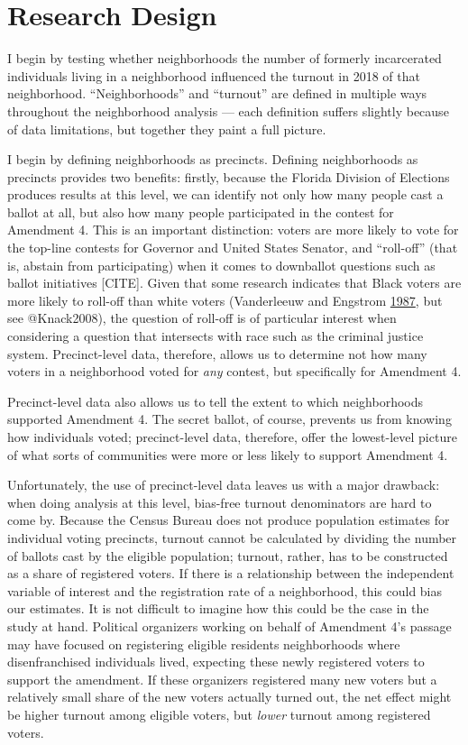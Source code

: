 \documentclass[
  12pt,
]{article}
\begin{document}
\hypertarget{research-design}{%
\section*{Research Design}\label{research-design}}

I begin by testing whether neighborhoods the number of formerly incarcerated individuals living in a neighborhood influenced the turnout in 2018 of that neighborhood. ``Neighborhoods'' and ``turnout'' are defined in multiple ways throughout the neighborhood analysis --- each definition suffers slightly because of data limitations, but together they paint a full picture.

I begin by defining neighborhoods as precincts. Defining neighborhoods as precincts provides two benefits: firstly, because the Florida Division of Elections produces results at this level, we can identify not only how many people cast a ballot at all, but also how many people participated in the contest for Amendment 4. This is an important distinction: voters are more likely to vote for the top-line contests for Governor and United States Senator, and ``roll-off'' (that is, abstain from participating) when it comes to downballot questions such as ballot initiatives {[}CITE{]}. Given that some research indicates that Black voters are more likely to roll-off than white voters (Vanderleeuw and Engstrom \protect\hyperlink{ref-Vanderleeuw1987}{1987}, but see @Knack2008), the question of roll-off is of particular interest when considering a question that intersects with race such as the criminal justice system. Precinct-level data, therefore, allows us to determine not how many voters in a neighborhood voted for \emph{any} contest, but specifically for Amendment 4.

Precinct-level data also allows us to tell the extent to which neighborhoods supported Amendment 4. The secret ballot, of course, prevents us from knowing how individuals voted; precinct-level data, therefore, offer the lowest-level picture of what sorts of communities were more or less likely to support Amendment 4.

Unfortunately, the use of precinct-level data leaves us with a major drawback: when doing analysis at this level, bias-free turnout denominators are hard to come by. Because the Census Bureau does not produce population estimates for individual voting precincts, turnout cannot be calculated by dividing the number of ballots cast by the eligible population; turnout, rather, has to be constructed as a share of registered voters. If there is a relationship between the independent variable of interest and the registration rate of a neighborhood, this could bias our estimates. It is not difficult to imagine how this could be the case in the study at hand. Political organizers working on behalf of Amendment 4's passage may have focused on registering eligible residents neighborhoods where disenfranchised individuals lived, expecting these newly registered voters to support the amendment. If these organizers registered many new voters but a relatively small share of the new voters actually turned out, the net effect might be higher turnout among eligible voters, but \emph{lower} turnout among registered voters.
\end{document}
